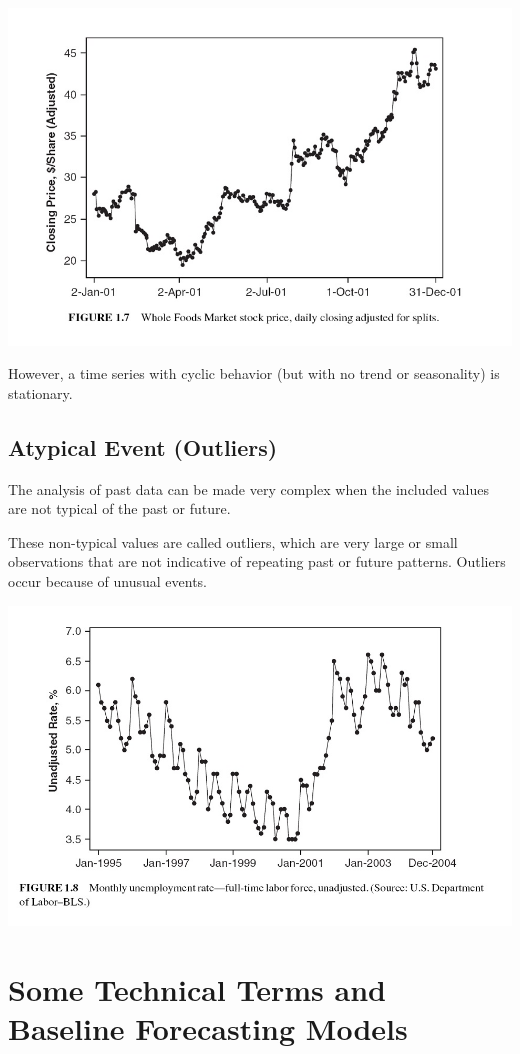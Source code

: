 \documentclass[
]{book}
\begin{document}
\begin{center}\includegraphics[width=0.8\linewidth]{img11/w11-Figure07} \end{center}

However, a time series with cyclic behavior (but with no trend or seasonality) is stationary.

\hypertarget{atypical-event-outliers}{%
\subsection{Atypical Event (Outliers)}\label{atypical-event-outliers}}

The analysis of past data can be made very complex when the included values are not typical of the past or future.

These non-typical values are called outliers, which are very large or small observations that are not indicative of repeating past or future patterns. Outliers occur because of unusual events.

\begin{center}\includegraphics[width=0.8\linewidth]{img11/w11-Figure08} \end{center}

\hypertarget{some-technical-terms-and-baseline-forecasting-models}{%
\section{Some Technical Terms and Baseline Forecasting Models}\label{some-technical-terms-and-baseline-forecasting-models}}
\end{document}
